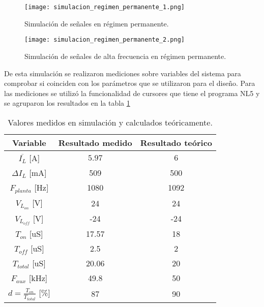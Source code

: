 \begin{figure}[H]
	\centering
	\texttt{[image: simulacion\_regimen\_permanente\_1.png]}
	\caption{Simulación de señales en régimen permanente.}
	\label{fig:simulacion_regimen_permanente_1}
\end{figure}

\begin{figure}[H]
	\centering
	\texttt{[image: simulacion\_regimen\_permanente\_2.png]}
	\caption{Simulación de señales de alta frecuencia en régimen permanente.}
	\label{fig:simulacion_regimen_permanente_2}
\end{figure}


De esta simulación se realizaron mediciones sobre variables del sistema para comprobar si coinciden con los parámetros que se utilizaron para el diseño. Para las mediciones se utilizó la funcionalidad de cursores que tiene el programa NL5 y se agruparon los resultados en la tabla \ref{tab_mediciones_simulacion}


\begin{table}[H]
	\begin{center}
		\begin{tabular}{| c | c | c |}
			\hline
			Variable & Resultado medido & Resultado teórico \\ \hline
			$\overline{I_L}$ [A] & $5.97$ & $6$ \\ \hline
			$\Delta I_L$ [mA] & 509 & 500 \\ \hline
			$F_{planta}$ [Hz]& 1080 &	1092 \\ \hline
			$V_{L_{on}}$ [V]&	24 & 24 \\ \hline
			$V_{L_{off}}$ [V]& -24 & -24 \\ \hline
			$T_{on}$ [uS] & 17.57 & 18 \\ \hline
			$T_{off}$ [uS] & 2.5 & 2 \\ \hline
			$T_{total}$ [uS] & 20.06 & 20 \\ \hline
			$F_{aux}$ [kHz] & 49.8 & 50 \\ \hline
			$d=\frac{T_{on}}{T_{total}}$ [\%] & 87 & 90 \\ \hline
		\end{tabular}
		\caption{Valores medidos en simulación y calculados teóricamente.}
		\label{tab_mediciones_simulacion}
	\end{center}
\end{table}

